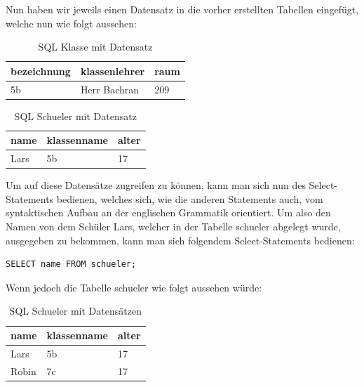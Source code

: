 \documentclass[12pt,a4paper,bibliography=totocnumbered,listof=totocnumbered]{scrartcl}
\begin{document}
Nun haben wir jeweils einen Datensatz in die vorher erstellten Tabellen eingefügt, welche nun wie folgt aussehen:
\vspace{1em}
\begin{table}[!h]
	\centering
	\begin{tabular}{|l|l|l|}
		\hline
		\textbf{bezeichnung} & \textbf{klassenlehrer} & \textbf{raum}\\
		\hline
		5b & Herr Bachran & 209\\
		
	\end{tabular}
	\caption{SQL Klasse mit Datensatz}
	\label{tab:sql-klasse2}
\end{table}
\vspace{1em}
\begin{table}[!h]
	\centering
	\begin{tabular}{|l|l|l|}
		\hline
		\textbf{name} & \textbf{klassenname} & \textbf{alter}\\
		\hline
		Lars & 5b & 17\\
		
	\end{tabular}
	\caption{SQL Schueler mit Datensatz}
	\label{tab:sql-schueler2}
\end{table}

Um auf diese Datensätze zugreifen zu können, kann man sich nun des \glqq Select-Statements\grqq{} bedienen, welches sich, wie die anderen Statements auch, vom syntaktischen Aufbau an der englischen Grammatik orientiert.
Um also den Namen von dem Schüler \glqq Lars\grqq, welcher in der Tabelle \glqq schueler\grqq{} abgelegt wurde, ausgegeben zu bekommen, kann man sich folgendem \glqq Select-Statements\grqq{} bedienen:


\vspace{1em}
\begin{lstlisting}[caption= SQL Select Name, label=lst:sql-select-name]
SELECT name FROM schueler;
\end{lstlisting}

Wenn jedoch die Tabelle \glqq schueler\grqq{} wie folgt aussehen würde:

\vspace{1em}
\begin{table}[!h]
	\centering
	\begin{tabular}{|l|l|l|}
		\hline
		\textbf{name} & \textbf{klassenname} & \textbf{alter}\\
		\hline
		Lars & 5b & 17\\
		\hline
		Robin & 7c & 17\\
		
	\end{tabular}
	\caption{SQL Schueler mit Datensätzen}
	\label{tab:sql-schueler3}
\end{table}
\end{document}
